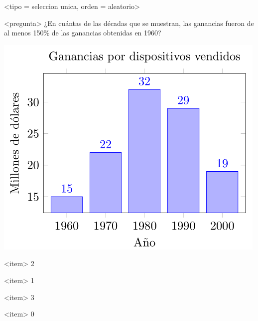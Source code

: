 <tipo = seleccion unica, orden = aleatorio>

<pregunta>
¿En cuántas de las décadas que se muestran, las ganancias fueron de al menos 150\% de las ganancias obtenidas en 1960?
\begin{center}
  \includegraphics[scale=0.5]{../Imagenes/ganancias.png}
\end{center}

<item>
2

<item>
1

<item>
3

<item>
0

